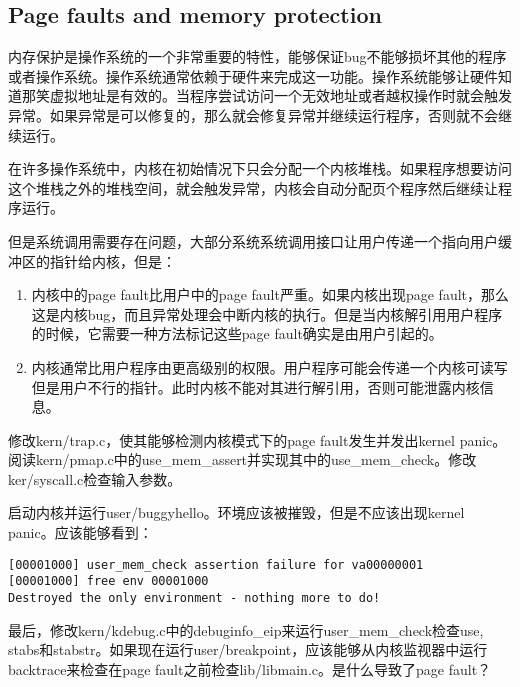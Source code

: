 \subsection{Page faults and memory protection}
\par 内存保护是操作系统的一个非常重要的特性，能够保证bug不能够损坏其他的程序或者操作系统。操作系统通常依赖于硬件来完成这一功能。操作系统能够让硬件知道那笑虚拟地址是有效的。当程序尝试访问一个无效地址或者越权操作时就会触发异常。如果异常是可以修复的，那么就会修复异常并继续运行程序，否则就不会继续运行。
\par 在许多操作系统中，内核在初始情况下只会分配一个内核堆栈。如果程序想要访问这个堆栈之外的堆栈空间，就会触发异常，内核会自动分配页个程序然后继续让程序运行。
\par 但是系统调用需要存在问题，大部分系统系统调用接口让用户传递一个指向用户缓冲区的指针给内核，但是：
\begin{enumerate}
    \item 内核中的page fault比用户中的page fault严重。如果内核出现page fault，那么这是内核bug，而且异常处理会中断内核的执行。但是当内核解引用用户程序的时候，它需要一种方法标记这些page fault确实是由用户引起的。
    \item 内核通常比用户程序由更高级别的权限。用户程序可能会传递一个内核可读写但是用户不行的指针。此时内核不能对其进行解引用，否则可能泄露内核信息。
\end{enumerate}

\begin{exerciseEnv}{9}
    \par 修改kern/trap.c，使其能够检测内核模式下的page fault发生并发出kernel panic。阅读kern/pmap.c中的use\_mem\_assert并实现其中的use\_mem\_check。修改ker/syscall.c检查输入参数。
    \par 启动内核并运行user/buggyhello。环境应该被摧毁，但是不应该出现kernel panic。应该能够看到：
    \begin{lstlisting}[numbers=none]
[00001000] user_mem_check assertion failure for va00000001
[00001000] free env 00001000
Destroyed the only environment - nothing more to do!
    \end{lstlisting}
    \par 最后，修改kern/kdebug.c中的debuginfo\_eip来运行user\_mem\_check检查use, stabs和stabstr。如果现在运行user/breakpoint，应该能够从内核监视器中运行backtrace来检查在page fault之前检查lib/libmain.c。是什么导致了page fault？
\end{exerciseEnv}

